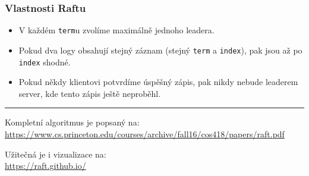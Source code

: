 \documentclass[usenames,dvipsnames,9pt]{beamer}
\begin{document}
\begin{frame}
  \frametitle{Vlastnosti Raftu}

  \begin{itemize}
    \item V každém \texttt{term}u zvolíme maximálně jednoho leadera. \\[1em]

    \pause
    \item Pokud dva logy obsahují stejný záznam (stejný \texttt{term} a \texttt{index}), pak jsou až po \texttt{index} shodné. \\[1em]
     
    \pause
    \item Pokud někdy klientovi potvrdíme úspěšný zápis, pak nikdy nebude leaderem server, kde tento zápis ještě neproběhl. \\[1em]
  \end{itemize}

  \pause\vspace{2em}\hrule\vspace{1em}

  Kompletní algoritmus je popsaný na:\\
  \url{https://www.cs.princeton.edu/courses/archive/fall16/cos418/papers/raft.pdf}

  \pause\vspace{1em}

  Užitečná je i vizualizace na:\\
  \url{https://raft.github.io/}
\end{frame}
\end{document}
